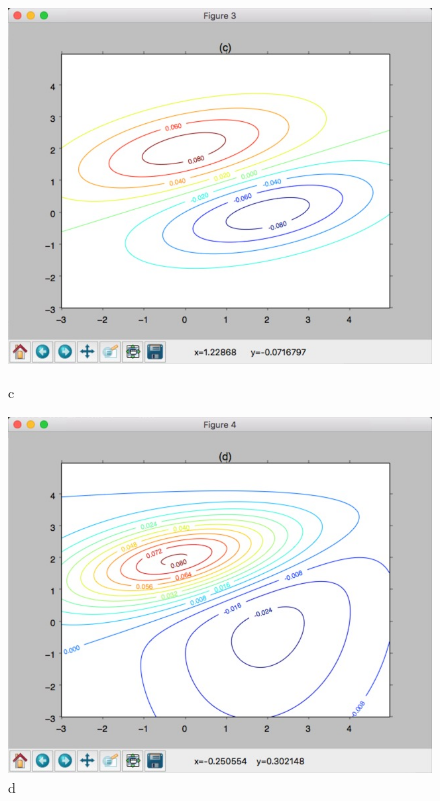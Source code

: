 \documentclass[11pt]{article}
\begin{document}
\begin{figure}[H]
\begin{center}
\includegraphics[scale=0.5]{3c}
\caption{c}
\includegraphics[scale=0.5]{3d}
\caption{d}
\end{center}
\end{figure}
\newpage
\end{document}
